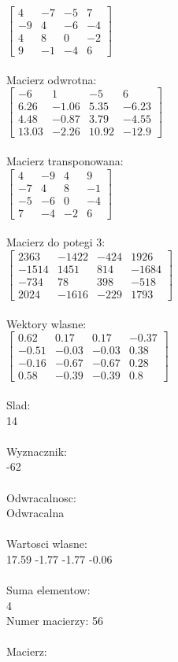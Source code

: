 \documentclass[a4paper,12pt]{article}
\begin{document}
$\begin{bmatrix} 4&-7&-5&7\\-9&4&-6&-4\\4&8&0&-2\\9&-1&-4&6 \end{bmatrix}$
\\
\\
Macierz odwrotna:\\

$\begin{bmatrix} -6&1&-5&6\\6.26&-1.06&5.35&-6.23\\4.48&-0.87&3.79&-4.55\\13.03&-2.26&10.92&-12.9 \end{bmatrix}$
\\
\\
Macierz transponowana:\\

$\begin{bmatrix} 4&-9&4&9\\-7&4&8&-1\\-5&-6&0&-4\\7&-4&-2&6 \end{bmatrix}$
\\
\\
Macierz do potegi 3:\\

$\begin{bmatrix} 2363&-1422&-424&1926\\-1514&1451&814&-1684\\-734&78&398&-518\\2024&-1616&-229&1793 \end{bmatrix}$
\\
\\
Wektory wlasne:\\

$\begin{bmatrix} 0.62&0.17&0.17&-0.37\\-0.51&-0.03&-0.03&0.38\\-0.16&-0.67&-0.67&0.28\\0.58&-0.39&-0.39&0.8 \end{bmatrix}$
\\
\\
Slad:\\
14
\\
\\
Wyznacznik:\\
-62
\\
\\
Odwracalnosc:\\
Odwracalna
\\
\\
Wartosci wlasne:\\
17.59 -1.77 -1.77 -0.06
\\
\\
Suma elementow:\\
4
\\
\newpage
Numer macierzy:
56
\\
\\
Macierz:\\
\end{document}
